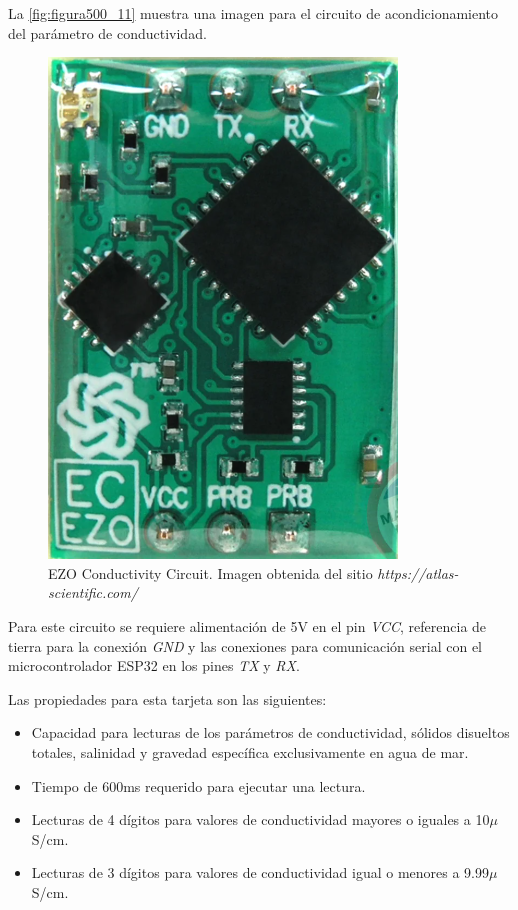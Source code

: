 La \autoref{fig:figura500_11} muestra una imagen para el circuito de acondicionamiento del parámetro de conductividad.

\clearpage

\begin{figure}[h]
	\centering
	\includegraphics[scale=0.7]{imgss211.png}
	\caption{EZO Conductivity Circuit. Imagen obtenida del sitio \textit{https://atlas-scientific.com/}}
	\label{fig:figura500_11}
\end{figure}

Para este circuito se requiere alimentación de 5V en el pin \textit{VCC}, referencia de tierra para la conexión \textit{GND} y las conexiones para comunicación serial con el microcontrolador ESP32 en los pines \textit{TX} 
y \textit{RX}.

Las propiedades para esta tarjeta son las siguientes:

\begin{itemize}
    \item Capacidad para lecturas de los parámetros de conductividad, sólidos disueltos totales, salinidad y gravedad específica exclusivamente en agua de mar.
    \item Tiempo de 600ms requerido para ejecutar una lectura.
    \item Lecturas de 4 dígitos para valores de conductividad mayores o iguales a 10$\mu$S/cm.
    \item Lecturas de 3 dígitos para valores de conductividad igual o menores a 9.99$\mu$S/cm. 
\end{itemize}

